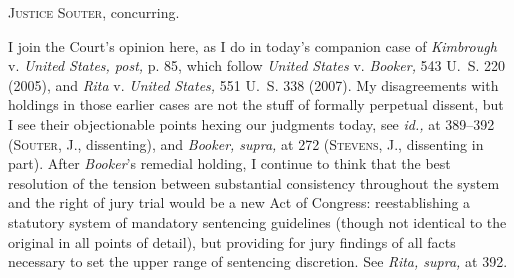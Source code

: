 
\setcounter{page}{60}

  \textsc{Justice Souter,} concurring.

  I join the Court's opinion here, as I do in today's companion
case of \emph{Kimbrough} v. \emph{United States, post,} p. 85, which
follow \emph{United States} v. \emph{Booker,} 543 U.~S. 220 (2005),
and \emph{Rita} v. \emph{United States,} 551 U.~S. 338 (2007). My
disagreements \newpage  with holdings in those earlier cases are
not the stuff of formally perpetual dissent, but I see their
objectionable points hexing our judgments today, see \emph{id.,} at
389--392 (\textsc{Souter,} J., dissenting), and \emph{Booker, supra,} at 272
(\textsc{Stevens,} J., dissenting in part). After \emph{Booker}'s remedial
holding, I continue to think that the best resolution of the tension
between substantial consistency throughout the system and the right of
jury trial would be a new Act of Congress: reestablishing a statutory
system of mandatory sentencing guidelines (though not identical to the
original in all points of detail), but providing for jury findings of
all facts necessary to set the upper range of sentencing discretion.
See \emph{Rita, supra,} at 392.
